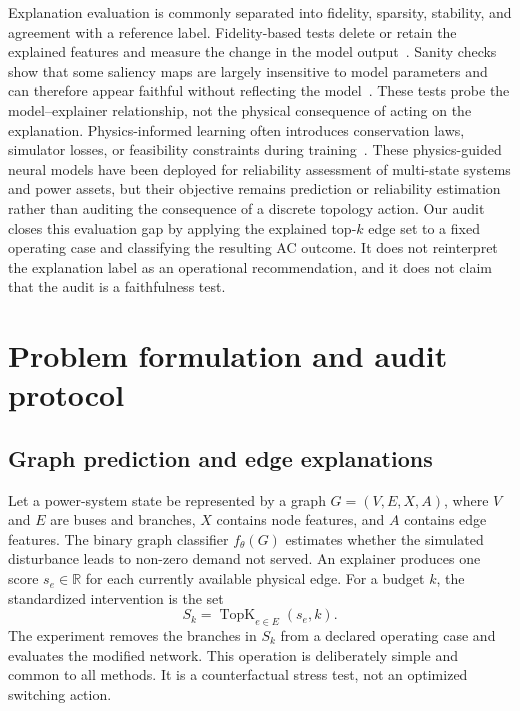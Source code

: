 Explanation evaluation is commonly separated into fidelity, sparsity, stability, and agreement with a reference label. Fidelity-based tests delete or retain the explained features and measure the change in the model output~\citep{samek2017,hooker2019}. Sanity checks show that some saliency maps are largely insensitive to model parameters and can therefore appear faithful without reflecting the model~\citep{adebayo2018}. These tests probe the model--explainer relationship, not the physical consequence of acting on the explanation. Physics-informed learning often introduces conservation laws, simulator losses, or feasibility constraints during training~\citep{misyris2020,xu2023,zhou2023pin,mei2024,li2026,he2025}. These physics-guided neural models have been deployed for reliability assessment of multi-state systems and power assets, but their objective remains prediction or reliability estimation rather than auditing the consequence of a discrete topology action. Our audit closes this evaluation gap by applying the explained top-$k$ edge set to a fixed operating case and classifying the resulting AC outcome. It does not reinterpret the explanation label as an operational recommendation, and it does not claim that the audit is a faithfulness test.

\section{Problem formulation and audit protocol}\label{problem_formulation_and_audit_protocol}

\subsection{Graph prediction and edge explanations}\label{graph_prediction_and_edge_explanation}

Let a power-system state be represented by a graph $G=(V,E,X,A)$, where $V$ and $E$ are buses and branches, $X$ contains node features, and $A$ contains edge features. The binary graph classifier $f_\theta(G)$ estimates whether the simulated disturbance leads to non-zero demand not served. An explainer produces one score $s_e \in \mathbb{R}$ for each currently available physical edge. For a budget $k$, the standardized intervention is the set
\begin{equation}
S_k = \operatorname{TopK}_{e\in E}(s_e,k).
\label{eq:topk}
\end{equation}
The experiment removes the branches in $S_k$ from a declared operating case and evaluates the modified network. This operation is deliberately simple and common to all methods. It is a counterfactual stress test, not an optimized switching action.

